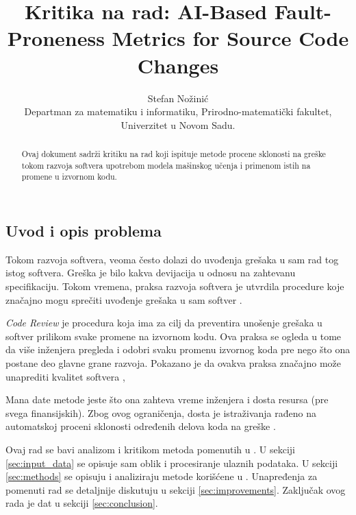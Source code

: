 \documentclass[twocolumns]{article}
\begin{document}
\title{Kritika na rad: AI-Based Fault-Proneness Metrics for Source Code Changes}
\author{Stefan Nožinić \\
Departman za matematiku i informatiku, Prirodno-matematički fakultet, Univerzitet u Novom Sadu. \\
}

\maketitle
\begin{abstract}
    Ovaj dokument sadrži kritiku na rad koji ispituje metode procene sklonosti na greške tokom razvoja softvera upotrebom modela mašinskog učenja i primenom istih na promene u izvornom kodu. 
\end{abstract}


\begin{multicols}{2}

  \section{Uvod i opis problema}
  \label{sec:introduction}
  
  Tokom razvoja softvera, veoma često dolazi do uvođenja grešaka u sam rad tog istog softvera. Greška je bilo kakva devijacija u odnosu na zahtevanu specifikaciju. Tokom vremena, praksa razvoja softvera je utvrdila procedure koje značajno mogu sprečiti uvođenje grešaka u sam softver \cite{kozlov2013fault}. 
  
  \textit{Code Review} je procedura koja ima za cilj da preventira unošenje grešaka u softver prilikom svake promene na izvornom kodu. Ova praksa se ogleda u tome da više inženjera pregleda i odobri svaku promenu izvornog koda pre nego što ona postane deo glavne grane razvoja. Pokazano je da ovakva praksa značajno može unaprediti kvalitet softvera \cite{kozlov2013fault},
  
  Mana date metode jeste što ona zahteva vreme inženjera i dosta resursa (pre svega finansijskih). Zbog ovog ograničenja, dosta je istraživanja rađeno na automatskoj proceni sklonosti određenih delova koda na greške \cite{altiero2023ai,fenton1999critique,gondra2008applying,ouellet2023combining}. 
  
  Ovaj rad se bavi analizom i kritikom metoda pomenutih u \cite{altiero2023ai}. U sekciji \ref{sec:input_data} se opisuje sam oblik i procesiranje ulaznih podataka. U sekciji \ref{sec:methods} se opisuju i analiziraju metode korišćene u \cite{altiero2023ai}. Unapređenja za pomenuti rad se detaljnije diskutuju u sekciji \ref{sec:improvements}. Zaključak ovog rada je dat u sekciji \ref{sec:conclusion}.
  

\end{multicols}
\end{document}
